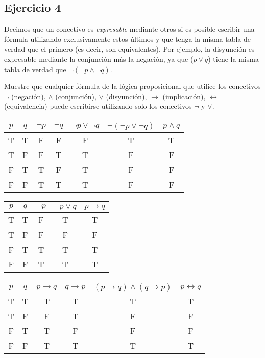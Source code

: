 \documentclass[10pt,a4paper]{article}
\begin{document}
\subsection*{Ejercicio 4}
Decimos que un conectivo es \textit{expresable} mediante otros si es posible escribir una fórmula utilizando exclusivamente estos últimos y que tenga la misma tabla de verdad que el primero (es decir, son equivalentes). Por ejemplo, la disyunción es expresable mediante la conjunción más la negación, ya que ($p \vee q$) tiene la misma tabla de verdad que $\neg(\neg p \wedge \neg q)$.

Muestre que cualquier fórmula de la lógica proposicional que utilice los conectivos $\neg$ (negación), $\wedge$ (conjunción), $\vee$ (disyunción), $\rightarrow$ (implicación), $\leftrightarrow$ (equivalencia) puede escribirse utilizando solo los
conectivos $\neg$ y $\vee$.

\begin{tabular}{|c|c|c|c|c|c|c|}
\hline
$p$ & $q$ & $\neg p$ & $\neg q$ & $\neg p \vee \neg q$ & $\neg(\neg p \vee \neg q)$ & $p \wedge q$ \\ \hline
T & T & F & F & F & T & T \\
T & F & F & T & T & F & F \\
F & T & T & F & T & F & F \\
F & F & T & T & T & F & F \\ \hline
\end{tabular}

\begin{tabular}{|c|c|c|c|c|}
\hline
$p$ & $q$ & $\neg p$ & $\neg p \vee q$  & $p \rightarrow q$ \\ \hline
T & T & F & T & T \\
T & F & F & F & F \\
F & T & T & T & T \\
F & F & T & T & T  \\ \hline
\end{tabular}

\begin{tabular}{|c|c|c|c|c|c|}
\hline
$p$ & $q$ & $p \rightarrow q$ & $q \rightarrow p$  & $(p \rightarrow q)\wedge (q\rightarrow p)$ & $p \leftrightarrow q$ \\ \hline
T & T & T & T & T & T \\
T & F & F & T & F & F\\
F & T & T & F & F & F\\
F & F & T & T & T & T \\ \hline
\end{tabular}
\end{document}
